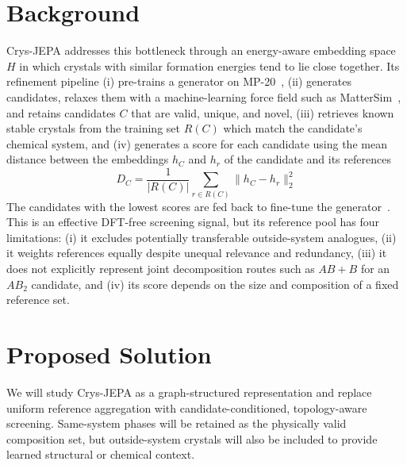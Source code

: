 \documentclass[10pt,a4paper]{article}
\newcommand{\sectionrule}{\vspace{-1.5pt}{\color{navy!35}\hrule height .35pt}\vspace{1.2pt}}
\begin{document}
\section*{Background}
\sectionrule
Crys-JEPA addresses this bottleneck through an energy-aware embedding space $H$ in which crystals with similar formation energies tend to lie close together. Its refinement pipeline (i) pre-trains a generator on MP-20~\cite{xie2022cdvae}, (ii) generates candidates, relaxes them with a machine-learning force field such as MatterSim~\cite{yang2024mattersim}, and retains candidates $C$ that are valid, unique, and novel, (iii) retrieves known stable crystals from the training set $R(C)$ which match the candidate's chemical system, and (iv) generates a score for each candidate using the mean distance between the embeddings $h_C$ and $h_r$ of the candidate and its references 
\[
  D_C = \frac{1}{|R(C)|} \sum_{r \in R(C)} \lVert h_C-h_r \rVert_2^2
\]
The candidates with the lowest scores are fed back to fine-tune the generator~\cite{liu2026crysjepa}. This is an effective DFT-free screening signal, but its reference pool has four limitations: (i) it excludes potentially transferable outside-system analogues, (ii) it weights references equally despite unequal relevance and redundancy, (iii) it does not explicitly represent joint decomposition routes such as $AB+B$ for an $AB_2$ candidate, and (iv) its score depends on the size and composition of a fixed reference set.

\section*{Proposed Solution}
\sectionrule
We will study Crys-JEPA as a graph-structured representation and replace uniform reference aggregation with candidate-conditioned, topology-aware screening. Same-system phases will be retained as the physically
valid composition set, but outside-system crystals will also be included to provide learned structural or chemical context.
\end{document}

